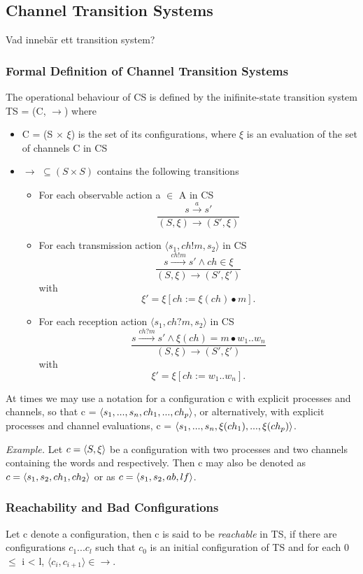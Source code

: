 \subsection{Channel Transition Systems}
Vad innebär ett transition system?

\subsubsection{Formal Definition of Channel Transition Systems}
\label{CTS}
The operational behaviour of CS is defined by the inifinite-state transition system TS = (C, $\rightarrow$) where
\begin{itemize}
\item[]
   C = (S $\times$ $\xi$) is the set of its configurations, where $\xi$ is an evaluation of the set of channels C in CS
\item[]
  $\rightarrow$ $\subseteq (S \times S)$ contains the following transitions
  \begin{itemize}
    \item
      For each observable action a $\in$ A in CS
      \[
      \dfrac{s \xrightarrow{a} s'}{(S, \xi) \rightarrow (S', \xi)}
      \]
    \item
      For each transmission action $\langle s_1, ch!m, s_2 \rangle$ in CS
      \[
      \dfrac{s \xrightarrow{ch!m} s' \wedge ch \in \xi}{(S, \xi) \rightarrow (S', \xi')} \] with \[ \xi' = \xi[ch := \xi (ch) \bullet m].
      \]
    \item
      For each reception action $\langle s_1, ch?m, s_2 \rangle$ in CS
      \[
      \dfrac{s \xrightarrow{ch?m} s' \wedge \xi(ch) = m \bullet w_1..w_n}{(S, \xi) \rightarrow (S', \xi')} \] with \[ \xi' = \xi[ch:= w_1..w_n].
      \]

  \end{itemize}
\end{itemize}

At times we may use a notation for a configuration c with explicit processes and channels, so that c = $\langle s_1,...,s_n, ch_1,...,ch_p\rangle$, or alternatively, with explicit processes and channel evaluations, c = $\langle s_1,...,s_n, \xi(ch_1),...,\xi(ch_p)\rangle$.

\emph{Example.} Let $c = \langle S,\xi\rangle$ be a configuration with two processes and two channels containing the words  and  respectively. Then c may also be denoted as $c = \langle s_1,s_2, ch_1, ch_2\rangle$ or as $c = \langle s_1,s_2,ab,lf\rangle$. 

\subsubsection{Reachability and Bad Configurations}
Let c denote a configuration, then c is said to be \emph{reachable} in TS, if there are configurations $c_1...c_l$ such that $c_0$ is an initial configuration of TS and for each 0 $\leq$ i < l, $\langle c_i, c_{i+1} \rangle \in \rightarrow$. 

